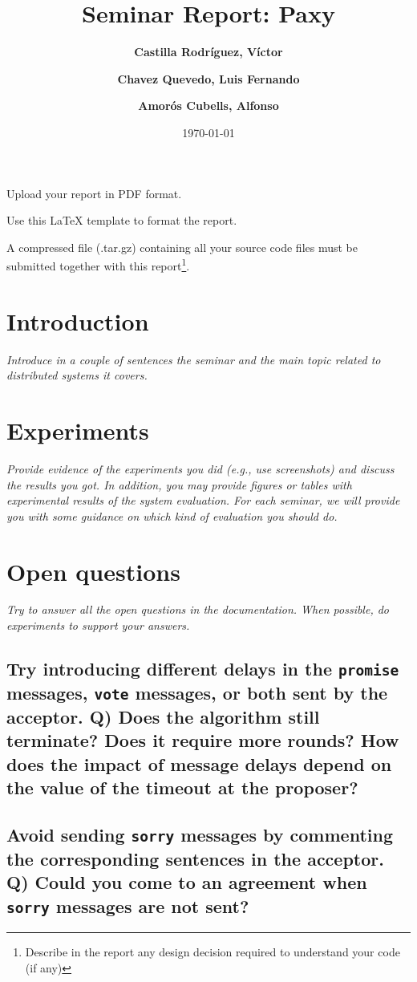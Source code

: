 \documentclass[a4paper, 10pt]{article}
\title{Seminar Report: Paxy}
\author{ \textbf{Castilla Rodríguez, Víctor} \and \textbf{Chavez Quevedo, Luis Fernando} \and \textbf{Amorós Cubells, Alfonso}
}
\date{\normalsize\today{}}
\begin{document}
\maketitle

\begin{center}
  Upload your report in PDF format.

  Use this LaTeX template to format the report.

	A compressed file (.tar.gz) containing all your source code files must be submitted together with this report\footnote{Describe in the report any design decision required to understand your code (if any)}.
\end{center}

\section{Introduction}

\textit{Introduce in a couple of sentences the seminar and the main topic related to distributed systems it covers.}

\section{Experiments}

\textit{Provide evidence of the experiments you did (e.g., use screenshots) and discuss the results you got. In addition, you may provide figures or tables with experimental results of the system evaluation. For each seminar, we will provide you with some guidance on which kind of evaluation you should do.}

\section{Open questions}

\textit{Try to answer all the open questions in the documentation. When possible, do experiments to support your answers.}

\subsection{Try introducing different delays in the
\texttt{promise} messages, \texttt{vote} messages, or both sent by the acceptor. Q) Does the
algorithm still terminate? Does it require more rounds? How does the impact
of message delays depend on the value of the timeout at the proposer?}

\subsection{Avoid sending \texttt{sorry} messages by commenting the corresponding sentences in the acceptor. Q) Could you come to an agreement when \texttt{sorry} messages are not sent?}
\end{document}
